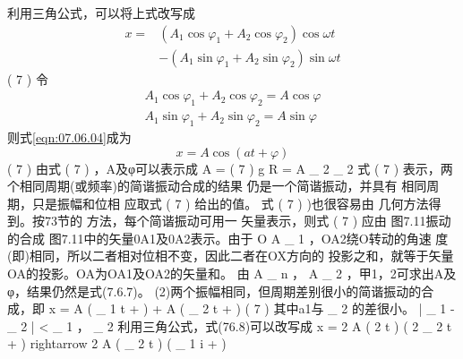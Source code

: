 利用三角公式，可以将上式改写成
\begin{equation}\label{eqn:07.06.04}
	\begin{aligned}
		x =& ( A _ { 1 } \cos \varphi _ { 1 } + A _ { 2 } \cos \varphi _ { 2 } ) \cos \omega t \\ 
		&- ( A _ { 1 } \sin \varphi _ { 1 } + A _ { 2 } \sin \varphi _ { 2 } ) \sin \omega t  
	\end{aligned}
\end{equation}
( 7   )  
令
\begin{equation}\label{eqn:07.06.05}
	\begin{aligned}
		A _ { 1 } \cos \varphi _ { 1 } + A _ { 2 } \cos \varphi _ { 2 } = A  \cos \varphi  \\
		A _ { 1 } \sin \varphi _ { 1 } + A _ { 2 }  \sin \varphi _ { 2 } = A  \sin \varphi
	\end{aligned}  
\end{equation}
则式\eqref{eqn:07.06.04}成为
\begin{equation}\label{eqn:07.06.06}
	x = A  \cos ( a t +  \varphi )  
\end{equation}
( 7   )  
由式 ( 7   )  ，A及φ可以表示成
A =   
( 7   )  
g R =  { A _ { 2 } }  \sin \varphi _ { 2 } 
式 ( 7   )  表示，两个相同周期(或频率)的简谐振动合成的结果
仍是一个简谐振动，并具有
相同周期，只是振幅和位相
应取式 ( 7   )  给出的值。
式 ( 7   )  )也很容易由
几何方法得到。按73节的
方法，每个简谐振动可用一
矢量表示，则式 ( 7   )  应由
图7.11振动的合成
图7.11中的矢量0A1及0A2表示。由于 O A _ { 1 }  ，OA2绕O转动的角速
度(即)相同，所以二者相对位相不变，因此二者在OX方向的
投影之和，就等于矢量OA的投影。OA为OA1及OA2的矢量和。
由 A _ { n }  ， A _ { 2 }  ，甲1，2可求出A及φ，结果仍然是式(7.6.7)。
(2)两个振幅相同，但周期差别很小的简谐振动的合成，即
x = A  \cos ( \omega _ { 1 } t + \varphi ) + A  \cos ( \omega _ { 2 } t + \varphi )  
( 7   )  
其中a1与 \omega _ { 2 }  的差很小。
| \omega _ { 1 } - \omega _ { 2 } | < \omega _ { 1 } ， \omega _ { 2 }  
利用三角公式，式(76.8)可以改写成
x = 2 A  \cos (  { 2 } t )  \cos (  { 2 } \omega _ { 2 } t + \varphi )  
rightarrow 2 A  \cos (  { \omega _ { 2 } } t )  \cos ( \omega _ { 1 } i + \varphi )  
